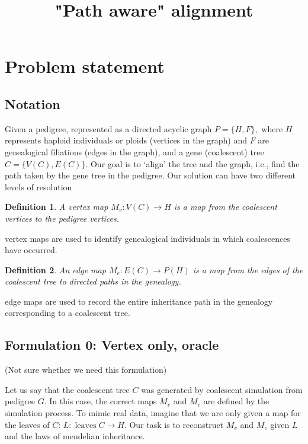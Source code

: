 \documentclass[14pt]{extarticle}
\newtheorem{definition}{Definition}
\begin{document}
	
	
\title{"Path aware" alignment}
\date{}


\section{Problem statement}

\subsection{Notation}

Given a pedigree, represented as a directed acyclic graph $P = \{H, F\},$ where $H$ represents haploid individuals or ploids (vertices in the graph) and $F$ are genealogical filiations (edges in the graph), and a gene (coalescent) tree $C = \{V(C), E(C)\}.$ Our goal is to `align' the tree and the graph, i.e., find the path taken by the gene tree in the pedigree. Our solution can have two different levels of resolution


\begin{definition}
A vertex map $M_v:V(C) \rightarrow H$ is a map from the coalescent vertices to the pedigree vertices.   
\end{definition}
vertex maps are used to identify genealogical individuals in which coalescences have occurred. 

\begin{definition}
An edge map $M_e:E(C) \rightarrow P(H)$ is a map from the edges of the coalescent tree to directed paths in the genealogy.    
\end{definition}
edge maps are used to record the entire inheritance path in the genealogy corresponding to a coalescent tree.  



\subsection{Formulation 0: Vertex only, oracle} (Not sure whether we need this formulation)

Let us say that the coalescent tree $C$ was generated by coalescent simulation from pedigree $G$. In this case, the correct maps $M_v$ and $M_e$ are defined by the simulation process. To mimic real data, imagine that we are only  given a map for the leaves of $C$: $L: \operatorname{leaves}{C} \rightarrow H.$ Our task is to reconstruct $M_v$ and $M_e$ given $L$ and the laws of mendelian inheritance.  
\end{document}
